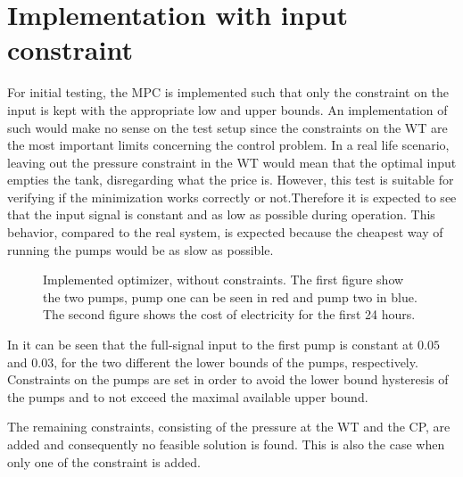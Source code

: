 \section{Implementation with input constraint}
\label{input constraint}

For initial testing, the MPC is implemented such that only the constraint on the input is kept with the appropriate low and upper bounds. An implementation of such would make no sense on the test setup since the constraints on the WT are the most important limits concerning the control problem. In a real life scenario, leaving out the pressure constraint in the WT would mean that the optimal input empties the tank, disregarding what the price is. However, this test is suitable for verifying if the minimization works correctly or not.Therefore it is expected to see that the input signal is constant and as low as possible during operation. This behavior, compared to the real system, is expected because the cheapest way of running the pumps would be as slow as possible. 

\begin{figure}[H]
\centering
 
\caption{Implemented optimizer, without constraints. The first figure show the two pumps, pump one can be seen in red and pump two in blue. The second figure shows the cost of electricity for the first 24 hours.}
\label{fig:Implementation_shit}
\end{figure}

In  it can be seen that the full-signal input to the first pump is constant at $0.05$ and $0.03$, for the two different the lower bounds of the pumps, respectively. Constraints on the pumps are set in order to avoid the lower bound hysteresis of the pumps and to not exceed the maximal available upper bound. 


The remaining constraints, consisting of the pressure at the WT and the CP, are added and consequently no feasible solution is found. This is also the case when only one of the constraint is added. 


